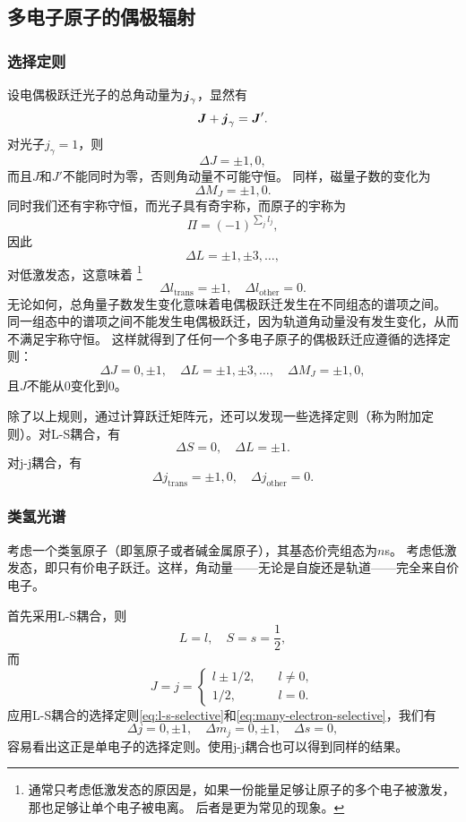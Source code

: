 \documentclass[UTF8, a4paper]{ctexart}
\begin{document}
\subsection{多电子原子的偶极辐射}

\subsubsection{选择定则}

设电偶极跃迁光子的总角动量为$\vb*{j}_\gamma$，显然有
\[
    \vb*{J} + \vb*{j}_\gamma = \vb*{J}'.
\]
对光子$j_\gamma=1$，则
\[
    \Delta J = \pm 1, 0, 
\]
而且$J$和$J'$不能同时为零，否则角动量不可能守恒。
同样，磁量子数的变化为
\[
    \Delta M_J = \pm 1, 0.
\]
同时我们还有宇称守恒，而光子具有奇宇称，而原子的宇称为
\[
    \Pi = (-1)^{\sum_{j} l_j},
\]
因此
\[
    \Delta L = \pm 1, \pm 3, \ldots,
\]
对低激发态，这意味着%
\footnote{通常只考虑低激发态的原因是，如果一份能量足够让原子的多个电子被激发，那也足够让单个电子被电离。
后者是更为常见的现象。}%
\[
    \Delta l_\text{trans} = \pm 1, \quad \Delta l_\text{other} = 0.
\]
无论如何，总角量子数发生变化意味着电偶极跃迁发生在不同组态的谱项之间。
同一组态中的谱项之间不能发生电偶极跃迁，因为轨道角动量没有发生变化，从而不满足宇称守恒。
这样就得到了任何一个多电子原子的偶极跃迁应遵循的选择定则：
\begin{equation}
    \Delta J = 0, \pm 1, \quad \Delta L = \pm 1, \pm 3, \ldots, \quad \Delta M_J = \pm 1, 0,
    \label{eq:many-electron-selective}
\end{equation}
且$J$不能从0变化到0。

除了以上规则，通过计算跃迁矩阵元，还可以发现一些选择定则（称为附加定则）。对L-S耦合，有
\begin{equation}
    \Delta S = 0, \quad \Delta L = \pm 1.
    \label{eq:l-s-selective}
\end{equation}
对j-j耦合，有
\begin{equation}
    \Delta j_\text{trans} = \pm 1, 0, \quad \Delta j_\text{other} = 0.
    \label{eq:j-j-selective}
\end{equation}

\subsubsection{类氢光谱}

考虑一个类氢原子（即氢原子或者碱金属原子），其基态价壳组态为$n$s。
考虑低激发态，即只有价电子跃迁。这样，角动量——无论是自旋还是轨道——完全来自价电子。

首先采用L-S耦合，则
\[
    L = l, \quad S = s = \frac{1}{2}, 
\]
而
\[
    J = j = \begin{cases}
        l \pm 1/2, &\quad l \neq 0, \\
        1/2, &\quad l = 0.
    \end{cases}
\]
应用L-S耦合的选择定则\eqref{eq:l-s-selective}和\eqref{eq:many-electron-selective}，我们有
\[
    \Delta j = 0, \pm 1, \quad \Delta m_j = 0, \pm 1, \quad \Delta s = 0, 
\]
容易看出这正是单电子的选择定则。使用j-j耦合也可以得到同样的结果。
\end{document}

